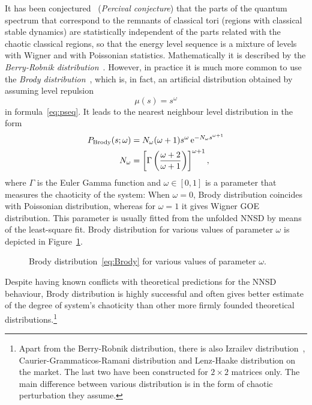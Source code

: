 \documentclass[a4paper,11pt,twoside]{article}
\begin{document}
        It has been conjectured~\cite{Per73} (\emph{Percival conjecture}) that the parts of the quantum spectrum that correspond to the remnants of classical tori (regions with classical stable dynamics) are statistically independent of the parts related with the chaotic classical regions, so that the energy level sequence is a mixture of levels with Wigner and with Poissonian statistics.
        Mathematically it is described by the \emph{Berry-Robnik distribution}~\cite{Ber84}.
        However, in practice it is much more common to use the \emph{Brody distribution}~\cite{Bro73}, which is, in fact, an artificial distribution obtained by assuming level repulsion
        \begin{equation}
            \mu(s)=s^{\omega}
        \end{equation}
        in formula~\eqref{eq:pseq}.
        It leads to the nearest neighbour level distribution in the form
        \begin{align}
            P_{\text{Brody}}(s;\omega)
                &=N_{\omega}(\omega+1)s^{\omega}\operatorname{e}^{-N_{\omega}s^{\omega+1}}
            \label{eq:Brody}\\
            N_{\omega}
                &=\left[\Gamma\left(\frac{\omega+2}{\omega+1}\right)\right]^{\omega+1},\nonumber
        \end{align}
        where $\Gamma$ is the Euler Gamma function and $\omega\in[0,1]$ is a parameter that measures the chaoticity of the system: When $\omega=0$, Brody distribution coincides with Poissonian distribution, whereas for $\omega=1$ it gives Wigner GOE distribution.
        This parameter is usually fitted from the unfolded NNSD by means of the least-square fit.
        Brody distribution for various values of parameter $\omega$ is depicted in Figure~\ref{fig:Brody}.

        \begin{figure}[!htbp]
            \centering{}
            \caption{
                \protect\small
                Brody distribution~\eqref{eq:Brody} for various values of parameter $\omega$. 
            }	
            \label{fig:Brody}
        \end{figure}        

        Despite having known conflicts with theoretical predictions for the NNSD behaviour, Brody distribution is highly successful and often gives better estimate of the degree of system's chaoticity than other more firmly founded theoretical distributions.\footnote{
            Apart from the Berry-Robnik distribution, there is also Izrailev distribution~\cite{Izr89}, Caurier-Grammaticos-Ramani distribution and Lenz-Haake distribution on the market.
            The last two have been constructed for $2\times2$ matrices only.
            The main difference between various distribution is in the form of chaotic perturbation they assume.
        }
\end{document}
